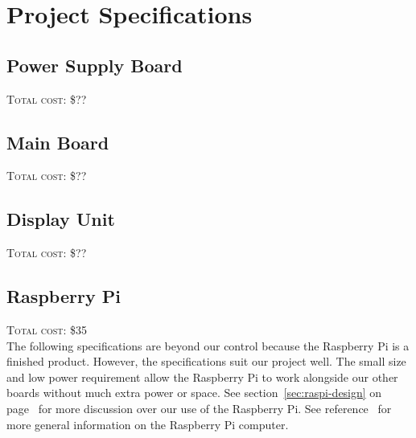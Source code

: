 \chapter{Project Specifications}





\section{Power Supply Board}
\textsc{Total cost: \$??}

\section{Main Board}
\textsc{Total cost: \$??}

\section{Display Unit}
\textsc{Total cost: \$??}

\section{Raspberry Pi}
\textsc{Total cost: \$35} \\

The following specifications are beyond our control because the Raspberry Pi
is a finished product. However, the specifications suit our project well. The
small size and low power requirement allow the Raspberry Pi to work alongside
our other boards without much extra power or space. See
section~\ref{sec:raspi-design} on page~\pageref{sec:raspi-design} for more
discussion over our use of the Raspberry Pi. See reference~\cite{raspifaq} for
more general information on the Raspberry Pi computer.

